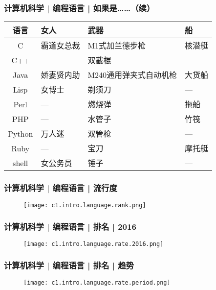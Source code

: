 \begin{frame}
  \frametitle{计算机科学 | 编程语言 | 如果是……（续）}
  \begin{table}
    \centering
    \begin{tabular}{clll}
      \hline
      \rowcolor{blue!50}语言 & 女人 & 武器 & 船\\
      \hline
      C & 霸道女总裁 & M1式加兰德步枪 & 核潜艇\\
      C++ & --- & 双截棍 & ---\\
      Java & 娇妻贤内助 & M240通用弹夹式自动机枪 & 大货船\\
      Lisp & 女博士 & 剃须刀 & ---\\
      Perl & --- & 燃烧弹 & 拖船\\
      PHP & --- & 水管子 & 竹筏\\
      Python & 万人迷 & 双管枪 & ---\\
      Ruby & --- & 宝刀 & 摩托艇\\
      shell & 女公务员 & 锤子 & ---\\
      \hline
    \end{tabular}
  \end{table}
\end{frame}

\begin{frame}
  \frametitle{计算机科学 | 编程语言 | 流行度}
  \begin{figure}
    \centering
    \texttt{[image: c1.intro.language.rank.png]}
  \end{figure}
\end{frame}

\begin{frame}
  \frametitle{计算机科学 | 编程语言 | 排名 | 2016}
  \begin{figure}
    \centering
    \texttt{[image: c1.intro.language.rate.2016.png]}
  \end{figure}
\end{frame}

\begin{frame}
  \frametitle{计算机科学 | 编程语言 | 排名 | 趋势}
  \begin{figure}
    \centering
    \texttt{[image: c1.intro.language.rate.period.png]}
  \end{figure}
\end{frame}

